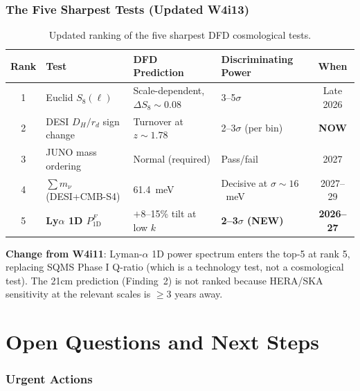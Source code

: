 \documentclass[11pt,a4paper]{article}
\begin{document}
\section{The Five Sharpest Tests (Updated W4i13)}

\begin{table}[H]
\centering
\caption{Updated ranking of the five sharpest DFD cosmological tests.}
\begin{tabular}{clp{4cm}p{3cm}c}
\toprule
\textbf{Rank} & \textbf{Test} & \textbf{DFD Prediction} &
  \textbf{Discriminating Power} & \textbf{When} \\
\midrule
1 & Euclid $S_8(\ell)$ & Scale-dependent, $\Delta S_8 \sim 0.08$ & 3--5$\sigma$ & Late 2026 \\
2 & DESI $D_H/r_d$ sign change & Turnover at $z \sim 1.78$ & 2--3$\sigma$ (per bin) & \textbf{NOW} \\
3 & JUNO mass ordering & Normal (required) & Pass/fail & 2027 \\
4 & $\sum m_\nu$ (DESI+CMB-S4) & 61.4~meV & Decisive at $\sigma \sim 16$~meV & 2027--29 \\
5 & \textbf{Ly$\alpha$ 1D $P^F_{1\text{D}}$} & $+8$--15\% tilt at low $k$ & \textbf{2--3$\sigma$ (NEW)} & \textbf{2026--27} \\
\bottomrule
\end{tabular}
\end{table}

\textbf{Change from W4i11}: Lyman-$\alpha$ 1D power spectrum enters
the top-5 at rank 5, replacing SQMS Phase I Q-ratio (which is a
technology test, not a cosmological test). The 21cm prediction
(Finding~2) is not ranked because HERA/SKA sensitivity at the
relevant scales is $\geq 3$ years away.


\part{Open Questions and Next Steps}

\section{Urgent Actions}
\end{document}
